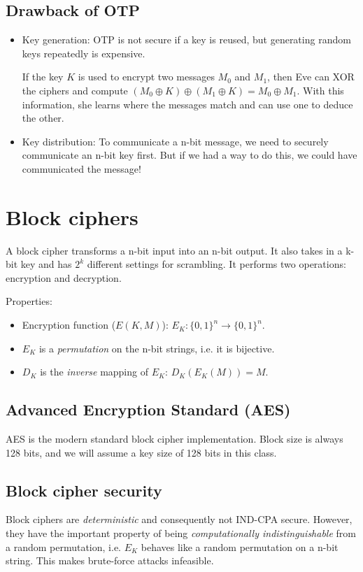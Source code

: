 \subsection{Drawback of OTP}
\begin{itemize}
    \item Key generation: OTP is not secure if a key is reused, but generating random keys repeatedly is expensive.
    
    If the key $K$ is used to encrypt two messages $M_0$ and $M_1$, then Eve can XOR the ciphers and compute $(M_0 \oplus K) \oplus (M_1 \oplus K) = M_0 \oplus M_1$. With this information, she learns where the messages match and can use one to deduce the other.
    
    \item Key distribution: To communicate a n-bit message, we need to securely communicate an n-bit key first. But if we had a way to do this, we could have communicated the message!
\end{itemize}


\section{Block ciphers}
A block cipher transforms a n-bit input into an n-bit output. It also takes in a k-bit key and has $2^k$ different settings for scrambling. It performs two operations: encryption and decryption.

\medskip

Properties:
\begin{itemize}
    \item Encryption function ($E(K, M)$): \(E_K: \{0, 1\}^n \rightarrow \{0, 1\}^n\).
    \item $E_K$ is a \emph{permutation} on the n-bit strings, i.e. it is bijective.
    \item $D_K$ is the \emph{inverse} mapping of $E_K$: $D_K(E_K(M)) = M$.
\end{itemize}

\subsection{Advanced Encryption Standard (AES)}
AES is the modern standard block cipher implementation. Block size is always 128 bits, and we will assume a key size of 128 bits in this class.

\subsection{Block cipher security}
Block ciphers are \emph{deterministic} and consequently not IND-CPA secure. However, they have the important property of being \emph{computationally indistinguishable} from a random permutation, i.e. $E_K$ behaves like a random permutation on a n-bit string. This makes brute-force attacks infeasible.

